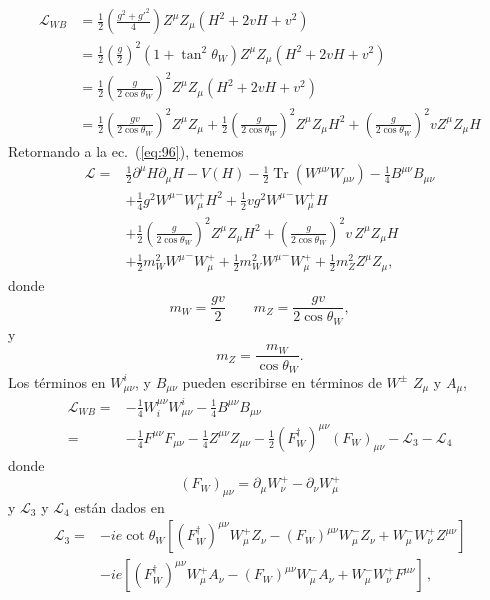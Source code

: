 \begin{align}
  \mathcal{L}_{WB}&=\frac{1}{2}\left(\frac{g^2+{g'}^2}{4}\right)Z^\mu Z_\mu
  \left(H^2+2vH+v^2\right)\nonumber\\
  &=\frac{1}{2}\left(\frac{g}{2}\right)^2\left(1+\tan^2\theta_W\right)Z^\mu Z_\mu\left(H^2+2vH+v^2\right)\nonumber\\
  &=\frac{1}{2}\left(\frac{g}{2\cos\theta_W}\right)^2Z^\mu Z_\mu\left(H^2+2vH+v^2\right)\nonumber\\
  &=\frac{1}{2}\left(\frac{gv}{2\cos\theta_W}\right)^2Z^\mu Z_\mu+\frac{1}{2}\left(\frac{g}{2\cos\theta_W}\right)^2Z^\mu Z_\mu H^2+\left(\frac{g}{2\cos\theta_W}\right)^2vZ^\mu Z_\mu H
\end{align}
Retornando a la ec.~(\ref{eq:96}), tenemos
\begin{align}
  \mathcal{L}=&\frac{1}{2}\partial^\mu H\partial_\mu H-V(H)-\tfrac{1}{2}\operatorname{Tr}\left(W^{\mu\nu}W_{\mu\nu}\right)-\tfrac{1}{4}B^{\mu\nu}B_{\mu\nu}\nonumber\\
  &+\frac{1}{4}g^2{W^\mu}^-W_\mu^+H^2+\frac{1}{2}vg^2{W^\mu}^-W_\mu^+H\nonumber\\
  &+\frac{1}{2}\left(\frac{g}{2\cos\theta_W}\right)^2Z^\mu Z_\mu H^2+\left(\frac{g}{2\cos\theta_W}\right)^2v\,Z^\mu Z_\mu H\nonumber\\
  &+\frac{1}{2}m_W^2{W^\mu}^-W_\mu^++\frac{1}{2}m_W^2{W^\mu}^-W_\mu^+ +\frac{1}{2}m_Z^2Z^\mu Z_\mu,
\end{align}
donde
\begin{equation}
  m_W=\frac{gv}{2}
  \qquad 
  m_Z=\frac{gv}{2\cos\theta_W},
\end{equation}
y
\begin{equation}
  m_Z=\frac{m_W}{\cos\theta_W}.
\end{equation}
Los t\'erminos en $W_{\mu\nu}^i$, y $B_{\mu\nu}$ pueden escribirse en t\'erminos de $W^\pm$ $Z_\mu$ y $A_\mu$, 
\begin{align}
  \mathcal{L}_{W B}=&-\tfrac{1}{4}W^{\mu\nu}_i W_{\mu\nu}^i-\tfrac{1}{4}B^{\mu\nu} B_{\mu\nu}\nonumber\\
  =&-\tfrac{1}{4}F^{\mu\nu} F_{\mu\nu}-\tfrac{1}{4}Z^{\mu\nu} Z_{\mu\nu}-\tfrac{1}{2}(F_W^\dagger)^{\mu\nu} (F_W)_{\mu\nu}-\mathcal{L}_3-\mathcal{L}_4
\end{align}
donde
\begin{equation}
  (F_W)_{\mu\nu}=\partial_\mu W^+_\nu-\partial_\nu W^+_\mu
\end{equation}
y $\mathcal{L}_3$ y $\mathcal{L}_4$ est\'an dados en \cite{Pich:2005mk}
\begin{align}
  \mathcal{L}_3=&-ie\cot\theta_W\left[(F_W^\dagger)^{\mu\nu}W_\mu^+ Z_\nu-(F_W)^{\mu\nu}W_\mu^- Z_\nu+W_\mu^-W_\nu^+Z^{\mu\nu}\right]\nonumber\\
&-ie\left[(F_W^\dagger)^{\mu\nu}W_\mu^+ A_\nu-(F_W)^{\mu\nu}W_\mu^- A_\nu+W_\mu^-W_\nu^+F^{\mu\nu}\right]\,,
\end{align}
